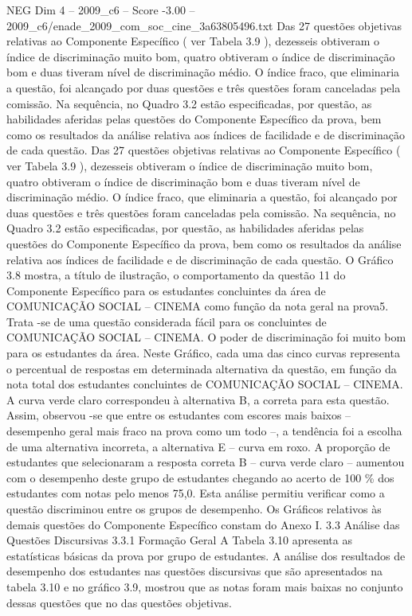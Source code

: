 \begin{textsample}{NEG Dim 4 – 2009\_c6 – Score -3.00 – 2009\_c6/enade\_2009\_com\_soc\_cine\_3a63805496.txt}
Das 27 questões objetivas relativas ao Componente Específico ( ver Tabela 3.9 ), dezesseis obtiveram o índice de discriminação muito bom, quatro obtiveram o índice de discriminação bom e duas tiveram nível de discriminação médio.
O índice fraco, que eliminaria a questão, foi alcançado por duas questões e três questões foram canceladas pela comissão.
Na sequência, no Quadro 3.2 estão especificadas, por questão, as habilidades aferidas pelas questões do Componente Específico da prova, bem como os resultados da análise relativa aos índices de facilidade e de discriminação de cada questão.
Das 27 questões objetivas relativas ao Componente Específico ( ver Tabela 3.9 ), dezesseis obtiveram o índice de discriminação muito bom, quatro obtiveram o índice de discriminação bom e duas tiveram nível de discriminação médio.
O índice fraco, que eliminaria a questão, foi alcançado por duas questões e três questões foram canceladas pela comissão.
Na sequência, no Quadro 3.2 estão especificadas, por questão, as habilidades aferidas pelas questões do Componente Específico da prova, bem como os resultados da análise relativa aos índices de facilidade e de discriminação de cada questão.
O Gráfico 3.8 mostra, a título de ilustração, o comportamento da questão 11 do Componente Específico para os estudantes concluintes da área de COMUNICAÇÃO SOCIAL – CINEMA como função da nota geral na prova5.
Trata -se de uma questão considerada fácil para os concluintes de COMUNICAÇÃO SOCIAL – CINEMA.
O poder de discriminação foi muito bom para os estudantes da área.
Neste Gráfico, cada uma das cinco curvas representa o percentual de respostas em determinada alternativa da questão, em função da nota total dos estudantes concluintes de COMUNICAÇÃO SOCIAL – CINEMA.
A curva verde claro correspondeu à alternativa B, a correta para esta questão.
Assim, observou -se que entre os estudantes com escores mais baixos – desempenho geral mais fraco na prova como um todo –, a tendência foi a escolha de uma alternativa incorreta, a alternativa E – curva em roxo.
A proporção de estudantes que selecionaram a resposta correta B – curva verde claro – aumentou com o desempenho deste grupo de estudantes chegando ao acerto de 100 \% dos estudantes com notas pelo menos 75,0.
Esta análise permitiu verificar como a questão discriminou entre os grupos de desempenho.
Os Gráficos relativos às demais questões do Componente Específico constam do Anexo I. 3.3 Análise das Questões Discursivas 3.3.1 Formação Geral A Tabela 3.10 apresenta as estatísticas básicas da prova por grupo de estudantes.
A análise dos resultados de desempenho dos estudantes nas questões discursivas que são apresentados na tabela 3.10 e no gráfico 3.9, mostrou que as notas foram mais baixas no conjunto dessas questões que no das questões objetivas.

\end{textsample}
